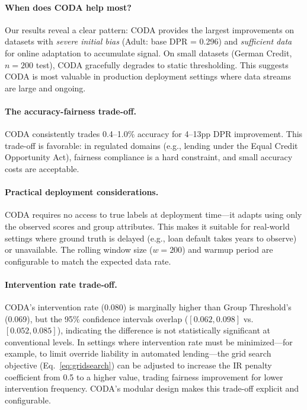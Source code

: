 \documentclass[10pt,twocolumn]{article}
\theoremstyle{definition}
\begin{document}
\paragraph{When does CODA help most?}
Our results reveal a clear pattern: CODA provides the largest improvements on datasets with \emph{severe initial bias} (Adult: base DPR = 0.296) and \emph{sufficient data} for online adaptation to accumulate signal. On small datasets (German Credit, $n=200$ test), CODA gracefully degrades to static thresholding. This suggests CODA is most valuable in production deployment settings where data streams are large and ongoing.

\paragraph{The accuracy-fairness trade-off.}
CODA consistently trades 0.4--1.0\% accuracy for 4--13pp DPR improvement. This trade-off is favorable: in regulated domains (e.g., lending under the Equal Credit Opportunity Act), fairness compliance is a hard constraint, and small accuracy costs are acceptable.

\paragraph{Practical deployment considerations.}
CODA requires no access to true labels at deployment time---it adapts using only the observed scores and group attributes. This makes it suitable for real-world settings where ground truth is delayed (e.g., loan default takes years to observe) or unavailable. The rolling window size ($w=200$) and warmup period are configurable to match the expected data rate.

\paragraph{Intervention rate trade-off.}
CODA's intervention rate (0.080) is marginally higher than Group Threshold's (0.069), but the 95\% confidence intervals overlap ($[0.062, 0.098]$ vs.\ $[0.052, 0.085]$), indicating the difference is not statistically significant at conventional levels. In settings where intervention rate must be minimized---for example, to limit override liability in automated lending---the grid search objective (Eq.~\ref{eq:gridsearch}) can be adjusted to increase the IR penalty coefficient from 0.5 to a higher value, trading fairness improvement for lower intervention frequency. CODA's modular design makes this trade-off explicit and configurable.
\end{document}
